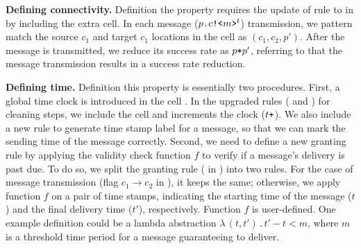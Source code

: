 \noindent\textbf{Defining connectivity.}
Definition the property requires the update of rule  to  in 
by including the extra  cell.
In each message ($p\texttt{.}c\texttt{!<}m\texttt{>}^t$) transmission, we pattern match the source $c_1$ and target $c_1$ locations in the  cell as $(c_1,c_2,p')$. After the message is transmitted, we reduce its success rate as $p\texttt{*}p'$, referring to that the message transmission results in a success rate reduction.

\noindent\textbf{Defining time.}
Definition this property is essentially two procedures.
First, a global time clock is introduced in the cell .
In the upgraded rules ( and ) for cleaning steps, we include the  cell and increments the clock ($t\texttt{+}$). We also include a new rule  to generate time stamp label for a message, so that we can mark the sending time of the message correctly. Second, we need to define a new granting rule by applying the validity check function $f$ to verify if a message's delivery is past due. To do so, we split the granting rule ( in ) into two rules.
For the case of message transmission (flag $c_1 \rightarrow c_2$ in ), it keeps the same;
otherwise, we apply function $f$ on a pair of time stamps, indicating the starting time of the message ($t$) and the final delivery time ($t'$), respectively. Function $f$ is user-defined. One example definition could be a lambda abstraction $\lambda\,(t,t')\,.\,t'-t<m$, where $m$ is a threshold time period for a message guaranteeing to deliver.

